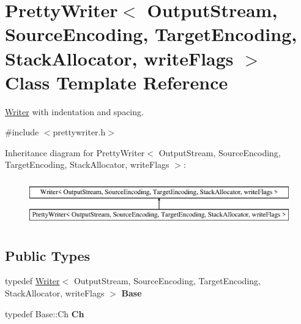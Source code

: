 \hypertarget{a02228}{}\section{Pretty\+Writer$<$ Output\+Stream, Source\+Encoding, Target\+Encoding, Stack\+Allocator, write\+Flags $>$ Class Template Reference}
\label{a02228}


\hyperlink{a02224}{Writer} with indentation and spacing.  




{\ttfamily \#include $<$prettywriter.\+h$>$}

Inheritance diagram for Pretty\+Writer$<$ Output\+Stream, Source\+Encoding, Target\+Encoding, Stack\+Allocator, write\+Flags $>$\+:\begin{figure}[H]
\begin{center}
\leavevmode
\includegraphics[height=2.000000cm]{a02228}
\end{center}
\end{figure}
\subsection*{Public Types}
\begin{DoxyCompactItemize}
\item 
\mbox{\label{a02228_a6eecc5c896dcdaffca739dcd39d13a17}} 
typedef \hyperlink{a02224}{Writer}$<$ Output\+Stream, Source\+Encoding, Target\+Encoding, Stack\+Allocator, write\+Flags $>$ {\bfseries Base}
\item 
\mbox{\label{a02228_ae35c89bda4c5d59d3ff6efcf2fea45a3}} 
typedef Base\+::\+Ch {\bfseries Ch}
\end{DoxyCompactItemize}
